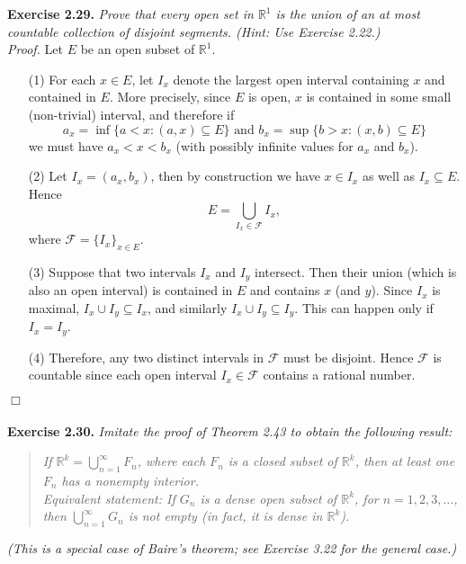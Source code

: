 \documentclass{article}
\begin{document}
\textbf{Exercise 2.29.}
\emph{Prove that every open set in $\mathbb{R}^1$ is the union of
an at most countable collection of disjoint segments.
(Hint: Use Exercise 2.22.)} \\

\emph{Proof.}
Let $E$ be an open subset of $\mathbb{R}^1$.
\begin{enumerate}
\item[(1)]
For each $x \in E$, let $I_x$ denote the largest open interval
containing $x$ and contained in $E$.
More precisely, since $E$ is open,
$x$ is contained in some small (non-trivial) interval,
and therefore if
$$a_x = \inf\{ a < x : (a,x) \subseteq E \} \text{ and }
b_x = \sup\{ b > x : (x,b) \subseteq E \}$$
we must have $a_x < x < b_x$ (with possibly infinite values for $a_x$ and $b_x$).
\item[(2)]
Let $I_x = (a_x, b_x)$, then by construction we have $x \in I_x$
as well as $I_x \subseteq E$.
Hence
$$E = \bigcup_{I_x \in \mathscr{F}} I_x,$$
where $\mathscr{F} = \{I_x\}_{x \in E}$.
\item[(3)]
Suppose that two intervals $I_x$ and $I_y$ intersect.
Then their union (which is also an open interval)
is contained in $E$ and contains $x$ (and $y$).
Since $I_x$ is maximal, $I_x \cup I_y \subseteq I_x$,
and similarly $I_x \cup I_y \subseteq I_y$.
This can happen only if $I_x = I_y$.
\item[(4)]
Therefore, any two distinct intervals in $\mathscr{F}$ must be disjoint.
Hence $\mathscr{F}$ is countable since each open interval $I_x \in \mathscr{F}$
contains a rational number.
\end{enumerate}
$\Box$ \\\\






\textbf{Exercise 2.30.}
\emph{Imitate the proof of Theorem 2.43 to obtain the following result:}
\begin{quote}
\emph{If $\mathbb{R}^k = \bigcup_{n=1}^{\infty} F_n$,
where each $F_n$ is a closed subset of $\mathbb{R}^k$,
then at least one $F_n$ has a nonempty interior.} \\

\emph{Equivalent statement: If $G_n$ is a dense open subset of $\mathbb{R}^k$,
for $n = 1,2,3,\ldots$, then $\bigcup_{n=1}^{\infty} G_n$ is not empty
(in fact, it is dense in $\mathbb{R}^k$).}
\end{quote}
\emph{(This is a special case of Baire's theorem; see Exercise 3.22 for the general case.)} \\



\end{document}

